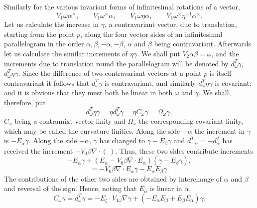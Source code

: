 \documentclass[11pt]{article}
\begin{document}
\indent Similarly for the various invariant forms of infinitesimal rotations of a vector,
\[
V_1\omega\alpha^\times,\qquad V_1\omega^\times\alpha,\qquad V_1\omega\eta\alpha,\qquad V_1\omega^\times\eta^{-1}\alpha^\times.
\]
Let us calculate the increase in $\gamma$, a contravariant vector, due to translation, starting from the point $p$, along the four vector sides of an infinitesimal parallelogram in the order $\alpha,\beta,-\alpha,-\beta$, $\alpha$ and $\beta$ being contravariant. Afterwards let us calculate the similar increments of $\eta\gamma$. We shall put $V_2\alpha\beta=\omega$, and the increments due to translation round the parallelogram will be denoted by $d_\omega^T\gamma$, $d_\omega^T\eta\gamma$. Since the difference of two contravariant vectors at a point $p$ is itself contravariant it follows that $d_\omega^T\gamma$ is contravariant, and similarly $d_\omega^T\eta\gamma$ is covariant; and it is obvious that they must both be linear in both $\omega$ and $\gamma$. We shall, therefore, put
\begin{equation}d_\omega^T\eta\gamma=\eta d_\omega^T\gamma=\eta C_\omega\gamma=\Omega_\omega\gamma,\tag{3}\end{equation}
$C_\omega$ being a contramixt vector linity and $\Omega_\omega$ the corresponding covariant linity, which may be called the curvature linities. Along the side $+\alpha$ the increment in $\gamma$ is $-E_\alpha\gamma$. Along the side $-\alpha$, $\gamma$ has changed to $\gamma-E_\beta\gamma$ and $d_{-\alpha}^T=-d_\alpha^T$ has received the increment $-V_0\beta\nabla\mathbin{\cdot}(\ )$. Thus, these two sides contribute increments
\[
-E_\alpha\gamma+(E_\alpha-V_0\beta\nabla\mathbin{\cdot}E_\alpha)(\gamma-E_\beta\gamma),
\]
\[
=-V_0\beta\nabla\mathbin{\cdot}E_\alpha\gamma-E_\alpha E_\beta\gamma.
\]
The contributions of the other two sides are obtained by interchange of $\alpha$ and $\beta$ and reversal of the sign. Hence, noting that $E_\alpha$ is linear in $\alpha$,
\begin{equation}C_\omega\gamma=d_\omega^T\gamma=-E_\zeta\mathbin{\cdot}V_{1\omega}\nabla\gamma+(-E_\alpha E_\beta+E_\beta E_\alpha)\gamma.\tag{4}\end{equation}
\indent [Since $d_\alpha^A=d_\alpha^0-d_\alpha^T$, and since $d_\alpha^0$ taken round the parallelogram produces zero we get that $C_\omega\tau=\tau_{\alpha\beta}-\tau_{\beta\alpha}$ which shows that absolute differentiations in different directions are not commutative.]
\end{document}
